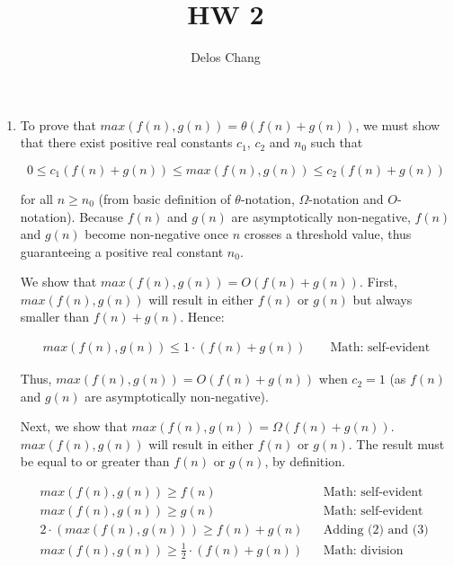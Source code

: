 \documentclass[a4paper]{report}
\title{HW 2}
\author{Delos Chang}
\date{}
\begin{document}
  \maketitle

  \begin{enumerate}
    \item To prove that $max(f(n),g(n)) = \theta (f(n) + g(n))$, we must show that there exist positive real constants $c_{1}$, $c_{2}$ and $n_{0}$ such that

      $$0 \leq c_{1}(f(n) + g(n)) \leq max(f(n),g(n)) \leq c_{2}(f(n) + g(n))$$
    
    for all $n \geq n_{0}$ (from basic definition of $\theta$-notation, $\Omega$-notation and $O$-notation). 
    Because $f(n)$ and $g(n)$ are asymptotically non-negative, $f(n)$ and $g(n)$ become non-negative once $n$ crosses a threshold value, thus guaranteeing a positive real constant $n_{0}$.

    We show that $max(f(n), g(n)) = O(f(n) + g(n))$.
    First, $max(f(n), g(n))$ will result in either $f(n)$ or $g(n)$ but always smaller than $f(n) + g(n)$. Hence:

    \begin{align}
      max(f(n), g(n)) \leq 1 \cdot (f(n) + g(n))              &&\text{ Math: self-evident}
    \end{align}

    Thus, $max(f(n), g(n)) = O(f(n) + g(n))$ when $c_{2} = 1$ (as $f(n)$ and $g(n)$ are asymptotically non-negative). 

    Next, we show that $max(f(n), g(n)) = \Omega(f(n) + g(n))$. $max(f(n), g(n))$ will result in either $f(n)$ or $g(n)$. The result must be equal to or greater than $f(n)$ or $g(n)$, by definition.

    \begin{align}
      max(f(n), g(n)) \geq  f(n)                          &&\text{Math: self-evident}\\
      max(f(n), g(n)) \geq  g(n)                          &&\text{Math: self-evident}\\
      2 \cdot (max(f(n),g(n))) \geq f(n) + g(n)               &&\text{Adding (2) and (3) }\\
      max(f(n),g(n)) \geq \frac{1}{2} \cdot (f(n) + g(n))       &&\text{Math: division}
    \end{align}


\end{enumerate}
\end{document}
